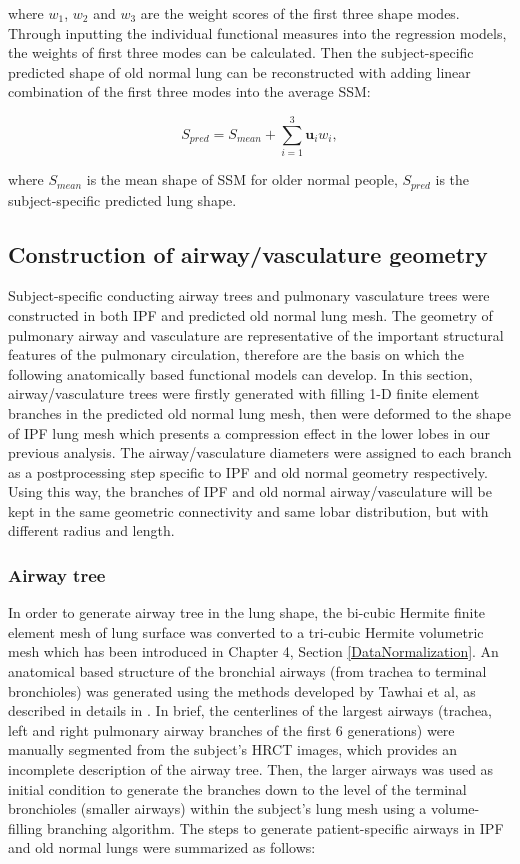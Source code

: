 \noindent where $w_1$, $w_2$ and $w_3$ are the weight scores of the first three shape modes. Through inputting the individual functional measures into the regression models, the weights of first three modes can be calculated. Then the subject-specific predicted shape of old normal lung can be reconstructed with adding linear combination of the first three modes into the average SSM:

\begin{equation}
 \label{eq:NormalLungPrediction}
 S_{pred} = S_{mean} + \sum_{i=1}^3 \mathbf{u}_i w_{i},
\end{equation}

\noindent where $S_{mean}$ is the mean shape of SSM for older normal people, $S_{pred}$ is the subject-specific predicted lung shape. 

\subsection{Construction of airway/vasculature geometry} \label{AirwayVesselGeometry}
Subject-specific conducting airway trees and pulmonary vasculature trees were constructed in both IPF and predicted old normal lung mesh. The  geometry of pulmonary airway and vasculature are representative of the important structural features of the pulmonary circulation, therefore are the basis on which the following anatomically based functional models can develop. In this section, airway/vasculature trees were firstly generated with filling 1-D finite element branches in the predicted old normal lung mesh, then were deformed to the shape of IPF lung mesh which presents a compression effect in the lower lobes in our previous analysis. The airway/vasculature diameters were assigned to each branch as a postprocessing step specific to IPF and old normal geometry respectively. Using this way, the branches of IPF and old normal airway/vasculature will be kept in the same geometric connectivity and same lobar distribution, but with different radius and length. 

\subsubsection{Airway tree}
In order to generate airway tree in the lung shape, the bi-cubic Hermite finite element mesh of lung surface was converted to a tri-cubic Hermite volumetric mesh which has been introduced in Chapter 4, Section \ref{DataNormalization}. An anatomical based structure of the bronchial airways (from trachea to terminal bronchioles) was generated using the methods developed by Tawhai et al, as described in details in \cite{tawhai2000generation, tawhai2004ct}. In brief, the centerlines of the largest airways (trachea, left and right pulmonary airway branches of the first 6 generations) were manually segmented from the subject's HRCT images, which provides an incomplete description of the airway tree. Then, the larger airways was used as initial condition to generate the branches down to the level of the terminal bronchioles (smaller airways) within the subject's lung mesh using a volume-filling branching algorithm. The steps to generate patient-specific airways in IPF and old normal lungs were summarized as follows:

